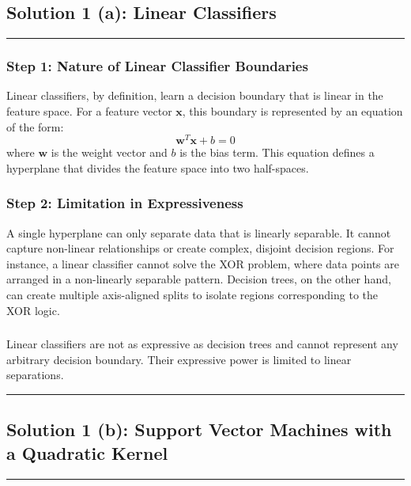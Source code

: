 \documentclass{article}
\begin{document}
\pagestyle{fancy}

\subsection*{Solution 1 (a): Linear Classifiers}
\noindent\rule{\textwidth}{0.4pt}

\subsubsection*{Step 1: Nature of Linear Classifier Boundaries}
\parbox{\textwidth}{
Linear classifiers, by definition, learn a decision boundary that is linear in the feature space. For a feature vector $\mathbf{x}$, this boundary is represented by an equation of the form:
$$ \mathbf{w}^T\mathbf{x} + b = 0 $$
where $\mathbf{w}$ is the weight vector and $b$ is the bias term. This equation defines a hyperplane that divides the feature space into two half-spaces.
}

\subsubsection*{Step 2: Limitation in Expressiveness}
\parbox{\textwidth}{
A single hyperplane can only separate data that is linearly separable. It cannot capture non-linear relationships or create complex, disjoint decision regions. For instance, a linear classifier cannot solve the XOR problem, where data points are arranged in a non-linearly separable pattern. Decision trees, on the other hand, can create multiple axis-aligned splits to isolate regions corresponding to the XOR logic.
}

\subsubsection*{}
\parbox{\textwidth}{
Linear classifiers are not as expressive as decision trees and cannot represent any arbitrary decision boundary. Their expressive power is limited to linear separations.
}

\noindent\rule{\textwidth}{0.4pt}

\newpage

\subsection*{Solution 1 (b): Support Vector Machines with a Quadratic Kernel}
\noindent\rule{\textwidth}{0.4pt}
\end{document}
